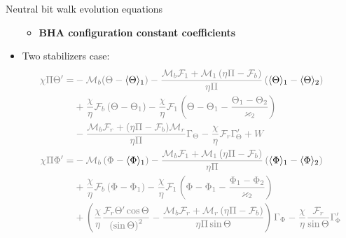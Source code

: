 \documentclass{beamer}
\begin{document}
\begin{frame}{Neutral bit walk evolution equations}
\begin{itemize}
		\begin{itemize}\setlength\itemsep{0.5em}
		\item []  	\normalsize \textbf{BHA configuration constant coefficients}
		\end{itemize}
		\item <3|only@3> []  \vspace{0.3cm} Two stabilizers case: \footnotesize
		\begin{equation}
		\begin{aligned}
		\color{gray}\chi \Pi \Theta ' =  &\color{gray}- \mathcal{M}_b(\Theta-\color{black}\langle\Theta \rangle_1\color{gray})-\frac{{{\mathcal{M}_b}{\mathcal{F}_1} + {\mathcal{M}_1}\left( {\eta \Pi  - {\mathcal{F}_b}} \right)}}{{\eta \Pi }}\left( {{\color{black}\langle\Theta \rangle_1\color{gray}} - {\color{black}\langle\Theta \rangle_2\color{gray}}} \right)
		\\
		&\color{gray}+\frac{\chi }{\eta }{\mathcal{F}_b}\left( {{\Theta} - {{\Theta}_1}} \right)
		- \frac{\chi }{\eta }{\mathcal{F}_1}\left( {{{{{\Theta}} - {{\Theta}_1}}} - \frac{{{{\Theta}_1} - {{\Theta}_{2}}}}{{{\varkappa _{2}}}}} \right)
		\\
		&\color{gray}- \frac{{{\mathcal{M}_b}{\mathcal{F}_r} + (\eta \Pi  - {\mathcal{F}_b}){\mathcal{M}_r}}}{{\eta \Pi }}{\Gamma _{\Theta}} - \frac{\chi }{\eta }{\mathcal{F}_r}\Gamma_{\!\Theta}' + W
		\\
		\color{gray}\chi \Pi \Phi ' =  &\color{gray}- {\mathcal{M}_b}\left( {\Phi  - {\color{black}\langle{\Phi} \rangle_1\color{gray}}} \right)-\frac{{{\mathcal{M}_b}{\mathcal{F}_1} + {\mathcal{M}_1}\left( {\eta \Pi  - {\mathcal{F}_b}} \right)}}{{\eta \Pi }}\left( {{\color{black}\langle{\Phi} \rangle_1\color{gray}} - {\color{black}\langle{\Phi} \rangle_2\color{gray}}} \right)
		\\
		&\color{gray}+\frac{\chi }{\eta }{\mathcal{F}_b}\left( {{\Phi} - {{\Phi}_1}} \right)
		- \frac{\chi }{\eta }{\mathcal{F}_1}\left( {{{{{\Phi}} - {{\Phi}_1}}} - \frac{{{{\Phi}_1} - {{\Phi}_{2}}}}{{{\varkappa _{2}}}}} \right)
		\\
		&\color{gray}+ \left( {\frac{\chi }{\eta }\frac{{{\mathcal{F}_r}\Theta '\cos \Theta }}{{{{\left( {\sin \Theta } \right)}^2}}} - \frac{{{\mathcal{M}_b}{\mathcal{F}_r} + {\mathcal{M}_r}\left( {\eta \Pi  - {\mathcal{F}_b}} \right)}}{{\eta \Pi \sin \Theta }}} \right){\Gamma _{\Phi}} - \frac{\chi }{\eta }\frac{{{\mathcal{F}_r}}}{{\sin \Theta }}\Gamma_{\!\Phi}'
		\end{aligned}
		\nonumber
		\end{equation}\\

\end{itemize}
\end{frame}
\end{document}
